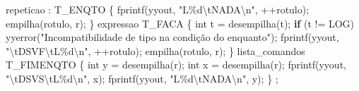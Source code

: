 \documentclass[
  brazilian,
  letterpaper,
]{book}
\newenvironment{Shaded}{\begin{snugshade}}{\end{snugshade}}
\newcommand{\CharTok}[1]{\textcolor[rgb]{0.13,0.47,0.30}{#1}}
\newcommand{\ControlFlowTok}[1]{\textcolor[rgb]{0.00,0.23,0.31}{\textbf{#1}}}
\newcommand{\DataTypeTok}[1]{\textcolor[rgb]{0.68,0.00,0.00}{#1}}
\newcommand{\NormalTok}[1]{\textcolor[rgb]{0.00,0.23,0.31}{#1}}
\newcommand{\OperatorTok}[1]{\textcolor[rgb]{0.37,0.37,0.37}{#1}}
\newcommand{\SpecialCharTok}[1]{\textcolor[rgb]{0.37,0.37,0.37}{#1}}
\newcommand{\StringTok}[1]{\textcolor[rgb]{0.13,0.47,0.30}{#1}}
\theoremstyle{plain}
\theoremstyle{definition}
\theoremstyle{remark}
\begin{document}
\begin{Shaded}
\begin{Highlighting}[]
\NormalTok{repeticao}
    \OperatorTok{:}\NormalTok{ T\_ENQTO }
        \OperatorTok{\{} 
\NormalTok{            fprintf}\OperatorTok{(}\NormalTok{yyout}\OperatorTok{,} \StringTok{"L}\SpecialCharTok{\%d\textbackslash{}t}\StringTok{NADA}\SpecialCharTok{\textbackslash{}n}\StringTok{"}\OperatorTok{,} \OperatorTok{++}\NormalTok{rotulo}\OperatorTok{);}
\NormalTok{            empilha}\OperatorTok{(}\NormalTok{rotulo}\OperatorTok{,} \CharTok{\textquotesingle{}r\textquotesingle{}}\OperatorTok{);} 
        \OperatorTok{\}}
\NormalTok{      expressao }
\NormalTok{      T\_FACA }
        \OperatorTok{\{} 
            \DataTypeTok{int}\NormalTok{ t }\OperatorTok{=}\NormalTok{ desempilha}\OperatorTok{(}\CharTok{\textquotesingle{}t\textquotesingle{}}\OperatorTok{);}
            \ControlFlowTok{if} \OperatorTok{(}\NormalTok{t }\OperatorTok{!=}\NormalTok{ LOG}\OperatorTok{)}
\NormalTok{                yyerror}\OperatorTok{(}\StringTok{"Incompatibilidade de tipo na condição do enquanto"}\OperatorTok{);}
\NormalTok{            fprintf}\OperatorTok{(}\NormalTok{yyout}\OperatorTok{,} \StringTok{"}\SpecialCharTok{\textbackslash{}t}\StringTok{DSVF}\SpecialCharTok{\textbackslash{}t}\StringTok{L}\SpecialCharTok{\%d\textbackslash{}n}\StringTok{"}\OperatorTok{,} \OperatorTok{++}\NormalTok{rotulo}\OperatorTok{);}
\NormalTok{            empilha}\OperatorTok{(}\NormalTok{rotulo}\OperatorTok{,} \CharTok{\textquotesingle{}r\textquotesingle{}}\OperatorTok{);}
        \OperatorTok{\}}
\NormalTok{      lista\_comandos }
\NormalTok{      T\_FIMENQTO}
        \OperatorTok{\{} 
            \DataTypeTok{int}\NormalTok{ y }\OperatorTok{=}\NormalTok{ desempilha}\OperatorTok{(}\CharTok{\textquotesingle{}r\textquotesingle{}}\OperatorTok{);}
            \DataTypeTok{int}\NormalTok{ x }\OperatorTok{=}\NormalTok{ desempilha}\OperatorTok{(}\CharTok{\textquotesingle{}r\textquotesingle{}}\OperatorTok{);}
\NormalTok{            fprintf}\OperatorTok{(}\NormalTok{yyout}\OperatorTok{,} \StringTok{"}\SpecialCharTok{\textbackslash{}t}\StringTok{DSVS}\SpecialCharTok{\textbackslash{}t}\StringTok{L}\SpecialCharTok{\%d\textbackslash{}n}\StringTok{"}\OperatorTok{,}\NormalTok{ x}\OperatorTok{);}
\NormalTok{            fprintf}\OperatorTok{(}\NormalTok{yyout}\OperatorTok{,} \StringTok{"L}\SpecialCharTok{\%d\textbackslash{}t}\StringTok{NADA}\SpecialCharTok{\textbackslash{}n}\StringTok{"}\OperatorTok{,}\NormalTok{ y}\OperatorTok{);}
        \OperatorTok{\}}
    \OperatorTok{;}
\end{Highlighting}
\end{Shaded}
\end{document}
